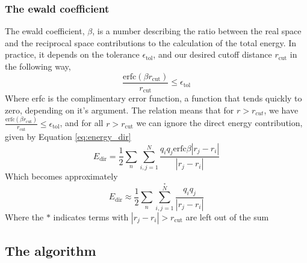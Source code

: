 \documentclass[pdftex,twoside,a4paper]{report}
\begin{document}
\subsubsection{The ewald coefficient}
The ewald coefficient, $\beta$, is a number describing the ratio between the real space and the reciprocal space contributions to the calculation of the total energy. In practice, it depends on the tolerance $\epsilon_\text{tol}$, and our desired cutoff distance $r_{\text{cut}}$ in the following way, \cite{darden:10089} \cite{essmann:8577}\\
\begin{equation}
\frac{\text{erfc}(\beta r_{\text{cut}})}{r_\text{cut}} \leq \epsilon_\text{tol}
\label{eq:ewald_coeff}
\end{equation}
Where erfc is the complimentary error function, a function that tends quickly to zero, depending on it's argument. The relation means that for $r > r_{cut}$, we have $\frac{\text{erfc}(\beta r_{\text{cut}})}{r_\text{cut}} \leq \epsilon_\text{tol}$, and for all $r > r_\text{cut}$ we can ignore the direct energy contribution, given by Equation \ref{eq:energy_dir} \cite{essmann:8577}\\
\begin{equation}
E_\text{dir} = \frac{1}{2} \sum_{n} \sum_{i,j = 1} ^N \frac{q_i q_j \text{erfc}{\beta |r_j - r_i|}}{|r_j - r_i|}
\label{eq:energy_dir}
\end{equation}
Which becomes approximately
\begin{equation}
E_\text{dir} \approx \frac{1}{2} \sum_{n} \sum_{i,j = 1} ^{\overset{*}{N}} \frac{q_i q_j}{|r_j - r_i|}
\label{eq:energy_dir_noerfc}
\end{equation}
Where the $*$ indicates terms with $|r_j - r_i| > r_{\text{cut}}$ are left out of the sum





\subsection{The algorithm}
\end{document}
